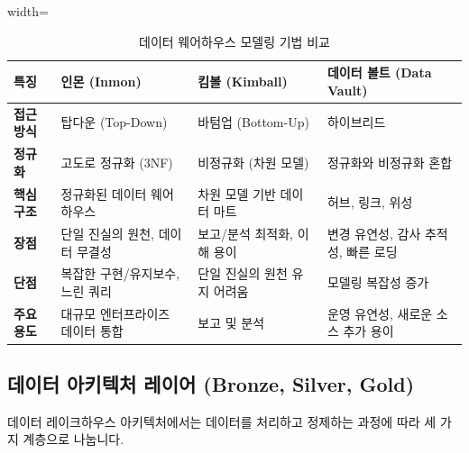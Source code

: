 \documentclass[11pt,a4paper]{article}
\begin{document}
\begin{table}[h!]
\centering
\caption{데이터 웨어하우스 모델링 기법 비교}
\label{tab:dwh_modeling_comparison}
\begin{adjustbox}{width=\textwidth}
\begin{tabular}{p{}p{}p{}p{}}
\toprule
\textbf{특징} & \textbf{인몬 (Inmon)} & \textbf{킴볼 (Kimball)} & \textbf{데이터 볼트 (Data Vault)} \\
\midrule
\textbf{접근 방식} & 탑다운 (Top-Down) & 바텀업 (Bottom-Up) & 하이브리드 \\
\textbf{정규화} & 고도로 정규화 (3NF) & 비정규화 (차원 모델) & 정규화와 비정규화 혼합 \\
\textbf{핵심 구조} & 정규화된 데이터 웨어하우스 & 차원 모델 기반 데이터 마트 & 허브, 링크, 위성 \\
\textbf{장점} & 단일 진실의 원천, 데이터 무결성 & 보고/분석 최적화, 이해 용이 & 변경 유연성, 감사 추적성, 빠른 로딩 \\
\textbf{단점} & 복잡한 구현/유지보수, 느린 쿼리 & 단일 진실의 원천 유지 어려움 & 모델링 복잡성 증가 \\
\textbf{주요 용도} & 대규모 엔터프라이즈 데이터 통합 & 보고 및 분석 & 운영 유연성, 새로운 소스 추가 용이 \\
\bottomrule
\end{tabular}
\end{adjustbox}
\end{table}

\subsection{데이터 아키텍처 레이어 (Bronze, Silver, Gold)}
데이터 레이크하우스 아키텍처에서는 데이터를 처리하고 정제하는 과정에 따라 세 가지 계층으로 나눕니다.
\end{document}
